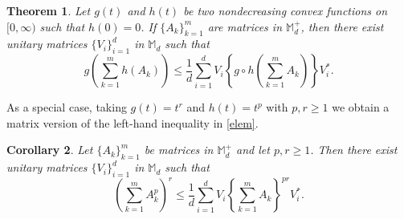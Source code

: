 \documentclass[12pt,reqno]{article}
\newtheorem{theorem}{Theorem}[section]
\newtheorem{cor}[theorem]{Corollary}
\theoremstyle{definition}
\theoremstyle{remark}
\numberwithin{equation}{section}
\def\bM{\mathbb{M}}
\begin{document}
\vskip 5pt
\begin{theorem}\label{th1} Let $g(t)$ and $h(t)$ be two nondecreasing convex functions on $[0,\infty)$ such that $h(0)=0$. If $\{A_k\}_{k=1}^m$ are  matrices in $\bM_d^+$, then there exist unitary matrices $\{V_i\}_{i=1}^d$  in $\bM_d$ such that 
$$ 
g\left(\sum_{k=1}^m h(A_k)\right) \le \frac{1}{d} \sum_{i=1}^d V_i\left\{ g\circ h\left(\sum_{k=1}^m A_k\right)\right\}V_i^*.
$$
\end{theorem}


\vskip 10pt
As a special case, taking $g(t)=t^r$ and $h(t)=t^{p}$
 with $p,r\ge 1$ we obtain a matrix version of the left-hand inequality in \eqref{elem}.



\vskip 5pt
\begin{cor} Let $\{A_k\}_{k=1}^m$ be matrices in $\bM_d^+$ and let $p,r\ge 1$. Then there exist unitary matrices $\{V_i\}_{i=1}^d$  in $\bM_d$ such that 
$$
\left(\sum_{k=1}^m A_k^p\right)^{r}  \le \frac{1}{d} \sum_{i=1}^d V_i\left\{\sum_{k=1}^m A_k\right\}^{pr}\!V_i^*.
$$
\end{cor}
\end{document}
